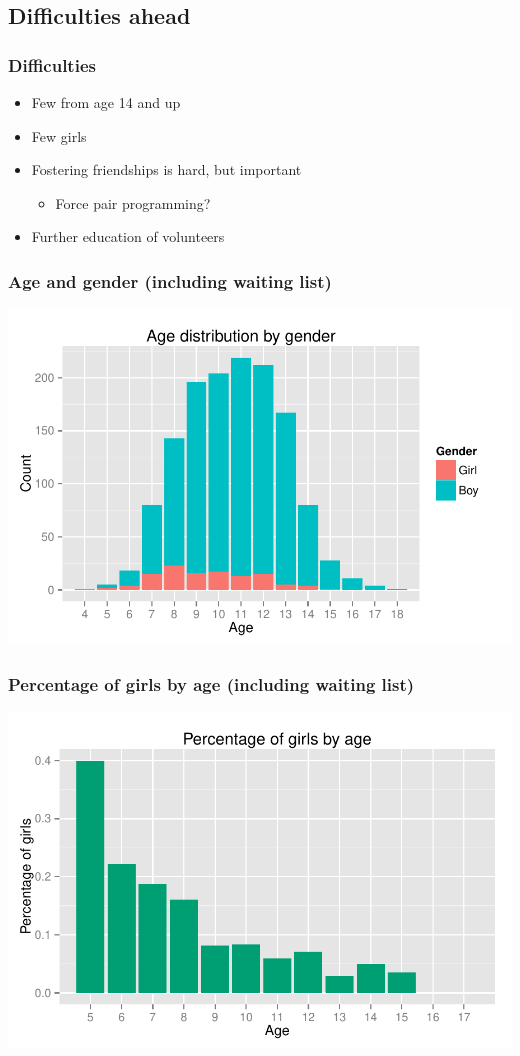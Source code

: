 \documentclass{beamer}
\begin{document}
\subsection{Difficulties ahead}
\begin{frame}
\frametitle{Difficulties}
\begin{itemize}
\item Few from age 14 and up
\item Few girls
\item Fostering friendships is hard, but important
  \begin{itemize}
  \item Force pair programming?
  \end{itemize}
\item Further education of volunteers
\end{itemize}
\end{frame}

\begin{frame}
  \frametitle{Age and gender (including waiting list)}
  \centerline{\includegraphics[width=\textwidth]{../datacrunching/age-gender-hist}}
\end{frame}

\begin{frame}
  \frametitle{Percentage of girls by age (including waiting list)}
  \centerline{\includegraphics[width=\textwidth]{../datacrunching/girl_percentage}}
\end{frame}
\end{document}
